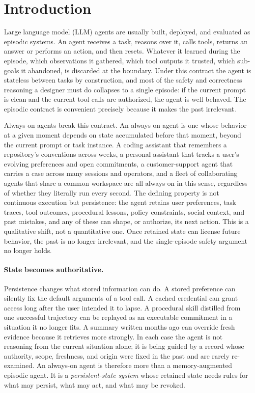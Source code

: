 \section{Introduction}\label{sec:intro}

Large language model (LLM) agents are usually built, deployed, and evaluated as episodic systems. An agent receives a task, reasons over it, calls tools, returns an answer or performs an action, and then resets. Whatever it learned during the episode, which observations it gathered, which tool outputs it trusted, which sub-goals it abandoned, is discarded at the boundary. Under this contract the agent is stateless between tasks by construction, and most of the safety and correctness reasoning a designer must do collapses to a single episode: if the current prompt is clean and the current tool calls are authorized, the agent is well behaved. The episodic contract is convenient precisely because it makes the past irrelevant.

Always-on agents break this contract. An always-on agent is one whose behavior at a given moment depends on state accumulated before that moment, beyond the current prompt or task instance. A coding assistant that remembers a repository's conventions across weeks, a personal assistant that tracks a user's evolving preferences and open commitments, a customer-support agent that carries a case across many sessions and operators, and a fleet of collaborating agents that share a common workspace are all always-on in this sense, regardless of whether they literally run every second. The defining property is not continuous execution but persistence: the agent retains user preferences, task traces, tool outcomes, procedural lessons, policy constraints, social context, and past mistakes, and any of these can shape, or authorize, its next action. This is a qualitative shift, not a quantitative one. Once retained state can license future behavior, the past is no longer irrelevant, and the single-episode safety argument no longer holds.

\paragraph{State becomes authoritative.} Persistence changes what stored information can do. A stored preference can silently fix the default arguments of a tool call. A cached credential can grant access long after the user intended it to lapse. A procedural skill distilled from one successful trajectory can be replayed as an executable commitment in a situation it no longer fits. A summary written months ago can override fresh evidence because it retrieves more strongly. In each case the agent is not reasoning from the current situation alone; it is being guided by a record whose authority, scope, freshness, and origin were fixed in the past and are rarely re-examined. An always-on agent is therefore more than a memory-augmented episodic agent. It is a \emph{persistent-state system} whose retained state needs rules for what may persist, what may act, and what may be revoked.

